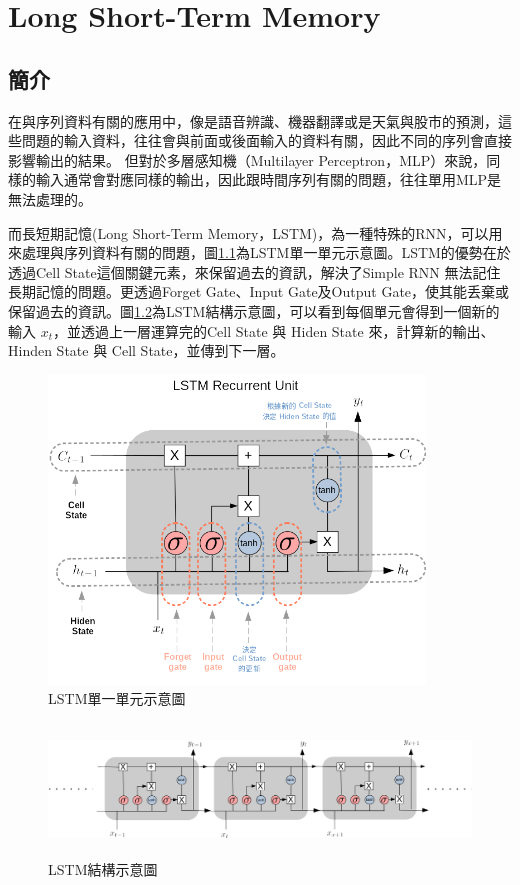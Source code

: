 \chapter{Long Short-Term Memory}
\label{chapter:lstm}
\section{簡介}
\label{sec:LstmIntroduction}


在與序列資料有關的應用中，像是語音辨識、機器翻譯或是天氣與股市的預測，這些問題的輸入資料，往往會與前面或後面輸入的資料有關，因此不同的序列會直接影響輸出的結果。
但對於多層感知機（Multilayer Perceptron，MLP）來說，同樣的輸入通常會對應同樣的輸出，因此跟時間序列有關的問題，往往單用MLP是無法處理的。

而長短期記憶(Long Short-Term Memory，LSTM)，為一種特殊的RNN，可以用來處理與序列資料有關的問題，圖\ref{fig:LstmUnit}為LSTM單一單元示意圖。LSTM的優勢在於透過Cell State這個關鍵元素，來保留過去的資訊，解決了Simple RNN 無法記住長期記憶的問題。更透過Forget Gate、Input Gate及Output Gate，使其能丢棄或保留過去的資訊。圖\ref{fig:LstmArchiture}為LSTM結構示意圖，可以看到每個單元會得到一個新的輸⼊ \(x_t\)，並透過上一層運算完的Cell State 與 Hiden State 來，計算新的輸出、Hinden State 與 Cell State，並傳到下一層。

\begin{figure}[h]
	\centering
	\includegraphics[width=10cm]{./pic/qpImeDw4.png}
	\caption{LSTM單一單元示意圖}
	\label{fig:LstmUnit}
\end{figure}


\begin{figure}[h]
	\centering
	\includegraphics[height=3.5cm]{./pic/rDEsxEUS.png}
	\caption{LSTM結構示意圖}
	\label{fig:LstmArchiture}
\end{figure}



